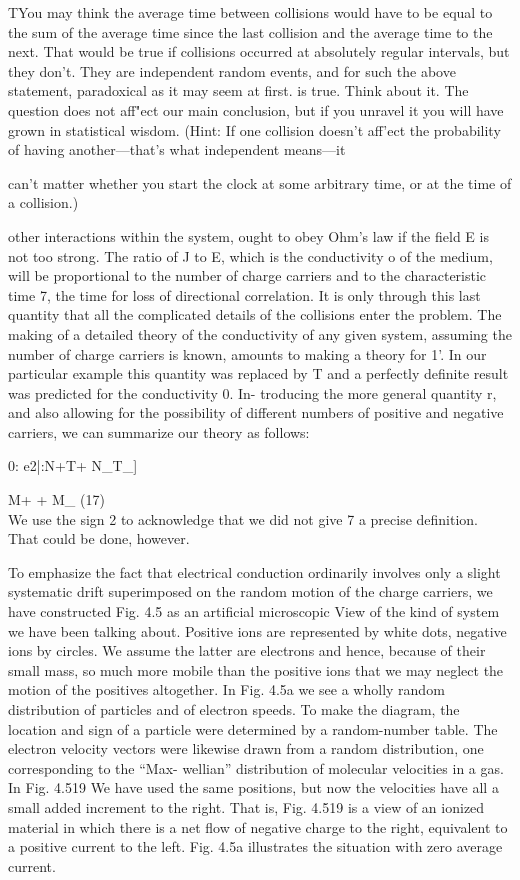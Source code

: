 TYou may think the average time between collisions would have to be equal to the
sum of the average time since the last collision and the average time to the next. That
would be true if collisions occurred at absolutely regular intervals, but they don't. They
are independent random events, and for such the above statement, paradoxical as it may
seem at first. is true. Think about it. The question does not aff"ect our main conclusion,
but if you unravel it you will have grown in statistical wisdom. (Hint: If one collision
doesn't aff'ect the probability of having another---that's what independent means---it

can't matter whether you start the clock at some arbitrary time, or at the time of a
collision.)

other interactions within the system, ought to obey Ohm's law if the
field E is not too strong. The ratio of J to E, which is the conductivity
o of the medium, will be proportional to the number of charge
carriers and to the characteristic time 7, the time for loss of directional
correlation. It is only through this last quantity that all the
complicated details of the collisions enter the problem. The making
of a detailed theory of the conductivity of any given system, assuming
the number of charge carriers is known, amounts to making a theory
for 1'. In our particular example this quantity was replaced by T and
a perfectly definite result was predicted for the conductivity 0. In-
troducing the more general quantity r, and also allowing for the
possibility of different numbers of positive and negative carriers, we
can summarize our theory as follows:

0: e2|:N+T+ N_T_]

M+ + M_ (17)
\begin{equation}
\end{equation}
We use the sign 2 to acknowledge that we did not give 7 a precise
definition. That could be done, however.

To emphasize the fact that electrical conduction ordinarily involves
only a slight systematic drift superimposed on the random motion
of the charge carriers, we have constructed Fig. 4.5 as an artificial
microscopic View of the kind of system we have been talking about.
Positive ions are represented by white dots, negative ions by circles.
We assume the latter are electrons and hence, because of their small
mass, so much more mobile than the positive ions that we may neglect
the motion of the positives altogether. In Fig. 4.5a we see a wholly
random distribution of particles and of electron speeds. To make
the diagram, the location and sign of a particle were determined by a
random-number table. The electron velocity vectors were likewise
drawn from a random distribution, one corresponding to the ``Max-
wellian'' distribution of molecular velocities in a gas. In Fig. 4.519
We have used the same positions, but now the velocities have all a
small added increment to the right. That is, Fig. 4.519 is a view of
an ionized material in which there is a net flow of negative charge to
the right, equivalent to a positive current to the left. Fig. 4.5a illustrates
the situation with zero average current.

